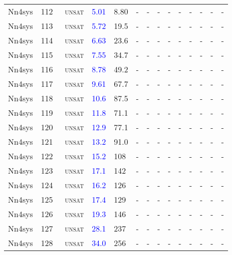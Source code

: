 \begin{center}
{\begin{longtable}{@{}llllllllllllll@{}}
Nn4sys & 112 & ~\textsc{unsat} & \textcolor{blue}{5.01} & \textcolor{second}{8.80} & - & - & - & - & - & - & - & - & - \\
Nn4sys & 113 & ~\textsc{unsat} & \textcolor{blue}{5.72} & \textcolor{second}{19.5} & - & - & - & - & - & - & - & - & - \\
Nn4sys & 114 & ~\textsc{unsat} & \textcolor{blue}{6.63} & \textcolor{second}{23.6} & - & - & - & - & - & - & - & - & - \\
Nn4sys & 115 & ~\textsc{unsat} & \textcolor{blue}{7.55} & \textcolor{second}{34.7} & - & - & - & - & - & - & - & - & - \\
Nn4sys & 116 & ~\textsc{unsat} & \textcolor{blue}{8.78} & \textcolor{second}{49.2} & - & - & - & - & - & - & - & - & - \\
Nn4sys & 117 & ~\textsc{unsat} & \textcolor{blue}{9.61} & \textcolor{second}{67.7} & - & - & - & - & - & - & - & - & - \\
Nn4sys & 118 & ~\textsc{unsat} & \textcolor{blue}{10.6} & \textcolor{second}{87.5} & - & - & - & - & - & - & - & - & - \\
Nn4sys & 119 & ~\textsc{unsat} & \textcolor{blue}{11.8} & \textcolor{second}{71.1} & - & - & - & - & - & - & - & - & - \\
Nn4sys & 120 & ~\textsc{unsat} & \textcolor{blue}{12.9} & \textcolor{second}{77.1} & - & - & - & - & - & - & - & - & - \\
Nn4sys & 121 & ~\textsc{unsat} & \textcolor{blue}{13.2} & \textcolor{second}{91.0} & - & - & - & - & - & - & - & - & - \\
Nn4sys & 122 & ~\textsc{unsat} & \textcolor{blue}{15.2} & \textcolor{second}{108} & - & - & - & - & - & - & - & - & - \\
Nn4sys & 123 & ~\textsc{unsat} & \textcolor{blue}{17.1} & \textcolor{second}{142} & - & - & - & - & - & - & - & - & - \\
Nn4sys & 124 & ~\textsc{unsat} & \textcolor{blue}{16.2} & \textcolor{second}{126} & - & - & - & - & - & - & - & - & - \\
Nn4sys & 125 & ~\textsc{unsat} & \textcolor{blue}{17.4} & \textcolor{second}{129} & - & - & - & - & - & - & - & - & - \\
Nn4sys & 126 & ~\textsc{unsat} & \textcolor{blue}{19.3} & \textcolor{second}{146} & - & - & - & - & - & - & - & - & - \\
Nn4sys & 127 & ~\textsc{unsat} & \textcolor{blue}{28.1} & \textcolor{second}{237} & - & - & - & - & - & - & - & - & - \\
Nn4sys & 128 & ~\textsc{unsat} & \textcolor{blue}{34.0} & \textcolor{second}{256} & - & - & - & - & - & - & - & - & - \\

\end{longtable}}
\end{center}

